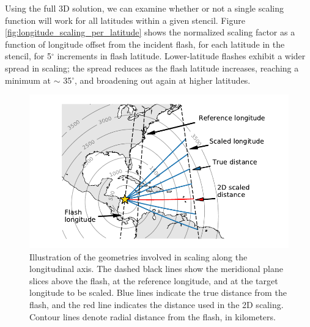 Using the full 3D solution, we can examine whether or not a single scaling function will work for all latitudes within a given stencil. Figure \ref{fig:longitude_scaling_per_latitude} shows the normalized scaling factor as a function of longitude offset from the incident flash, for each latitude in the stencil, for 5$^\circ$ increments in flash latitude. Lower-latitude flashes exhibit a wider spread in scaling; the spread reduces as the flash latitude increases, reaching a minimum at $\sim$ 35$^\circ$, and broadening out again at higher latitudes.

\begin{figure}[h!]
\begin{center}
\includegraphics{figures/longitude_scaling_diagram.pdf}
\caption[2D vs 3D longitude scaling geometries]{Illustration of the geometries involved in scaling along the longitudinal axis. The dashed black lines show the meridional plane slices above the flash, at the reference longitude, and at the target longitude to be scaled. Blue lines indicate the true distance from the flash, and the red line indicates the distance used in the 2D scaling. Contour lines denote radial distance from the flash, in kilometers.}
\label{fig:longitude_scaling_diagram}
\end{center}
\end{figure}

